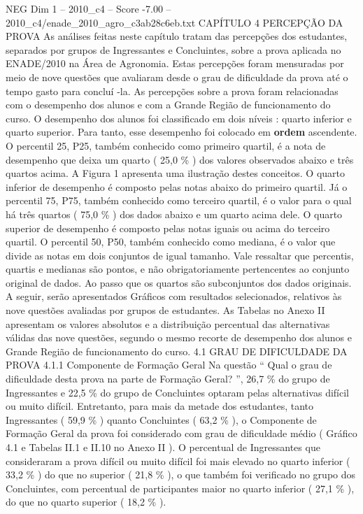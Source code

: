 \begin{textsample}{NEG Dim 1 – 2010\_c4 – Score -7.00 – 2010\_c4/enade\_2010\_agro\_c3ab28c6eb.txt}  \label{ex:f1_neg_038}
CAPÍTULO 4 PERCEPÇÃO DA PROVA As análises feitas neste capítulo tratam das percepções dos estudantes, separados por grupos de Ingressantes e Concluintes, sobre a prova aplicada no ENADE/2010 na Área de Agronomia.
Estas percepções foram mensuradas por meio de nove questões que avaliaram desde o grau de dificuldade da prova até o tempo gasto para concluí -la.
As percepções sobre a prova foram relacionadas com o desempenho dos alunos e com a Grande Região de funcionamento do curso.
O desempenho dos alunos foi classificado em dois níveis : quarto inferior e quarto superior.
Para tanto, esse desempenho foi colocado em \textbf{ordem} ascendente.
O percentil 25, P25, também conhecido como primeiro quartil, é a nota de desempenho que deixa um quarto ( 25,0 \% ) dos valores observados abaixo e três quartos acima.
A Figura 1 apresenta uma ilustração destes conceitos.
O quarto inferior de desempenho é composto pelas notas abaixo do primeiro quartil.
Já o percentil 75, P75, também conhecido como terceiro quartil, é o valor para o qual há três quartos ( 75,0 \% ) dos dados abaixo e um quarto acima dele.
O quarto superior de desempenho é composto pelas notas iguais ou acima do terceiro quartil.
O percentil 50, P50, também conhecido como mediana, é o valor que divide as notas em dois conjuntos de igual tamanho.
Vale ressaltar que percentis, quartis e medianas são pontos, e não obrigatoriamente pertencentes ao conjunto original de dados.
Ao passo que os quartos são subconjuntos dos dados originais.
A seguir, serão apresentados Gráficos com resultados selecionados, relativos às nove questões avaliadas por grupos de estudantes.
As Tabelas no Anexo II apresentam os valores absolutos e a distribuição percentual das alternativas válidas das nove questões, segundo o mesmo recorte de desempenho dos alunos e Grande Região de funcionamento do curso. 4.1 GRAU DE DIFICULDADE DA PROVA 4.1.1 Componente de Formação Geral Na questão “ Qual o grau de dificuldade desta prova na parte de Formação Geral? ”, 26,7 \% do grupo de Ingressantes e 22,5 \% do grupo de Concluintes optaram pelas alternativas difícil ou muito difícil.
Entretanto, para mais da metade dos estudantes, tanto Ingressantes ( 59,9 \% ) quanto Concluintes ( 63,2 \% ), o Componente de Formação Geral da prova foi considerado com grau de dificuldade médio ( Gráfico 4.1 e Tabelas II.1 e II.10 no Anexo II ).
O percentual de Ingressantes que consideraram a prova difícil ou muito difícil foi mais elevado no quarto inferior ( 33,2 \% ) do que no superior ( 21,8 \% ), o que também foi verificado no grupo dos Concluintes, com percentual de participantes maior no quarto inferior ( 27,1 \% ), do que no quarto superior ( 18,2 \% ).

\end{textsample}
